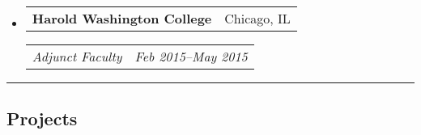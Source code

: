\documentclass[10pt,letterpaper]{article}
\makeatletter
\newcommand{\headerrow}[2]
{\begin{tabular*}{\linewidth}{l@{\extracolsep{\fill}}r}
	#1 &
	#2 \\
\end{tabular*}}
\makeatother
\begin{document}
\begin{itemize}
	\parskip=-0.1em
	\item
	\headerrow
		{\textbf{Harold Washington College}}
		{Chicago, IL}
	\headerrow
		{\emph{Adjunct Faculty}}
		{\emph{Feb 2015--May 2015}}
\end{itemize}


\hrule
\subsection*{Projects}
\end{document}
